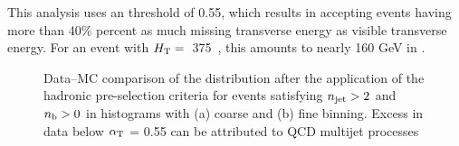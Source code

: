This analysis uses an \alphat threshold of 0.55, which results in accepting
events having more than 40\% percent as much missing transverse energy as visible transverse
energy. For an event with $\mbox{$H_\text{T}$}=$~375~\gev, this amounts to nearly 160 GeV in \mht.  
%
\begin{figure}[!h]
  \centering
  \caption{Data--MC comparison of the \alphat distribution after 
           the application of the hadronic pre-selection 
           criteria for events satisfying $n_{\text{jet}} > 2$ and $n_{\text{b}} > 0$ 
           in histograms with (a) coarse and (b) fine binning. Excess in data below $\alpha_{\text{T}}$ = 0.55 can be
           attributed to QCD multijet processes}
  \label{fig:figures_AlphaT_all}
\end{figure}

\FloatBarrier
